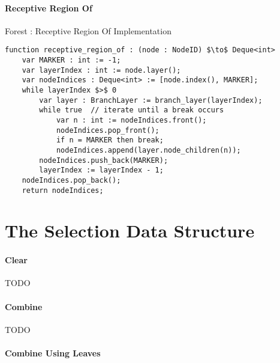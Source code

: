 \paragraph{Receptive Region Of}

\begin{stulisting}[H]
\caption{Forest : Receptive Region Of Implementation}
\begin{lstlisting}[style=Default]
function receptive_region_of : (node : NodeID) $\to$ Deque<int>
	var MARKER : int := -1;
	var layerIndex : int := node.layer();
	var nodeIndices : Deque<int> := [node.index(), MARKER];
	while layerIndex $>$ 0
		var layer : BranchLayer := branch_layer(layerIndex);
		while true	// iterate until a break occurs
			var n : int := nodeIndices.front();
			nodeIndices.pop_front();
			if n = MARKER then break;
			nodeIndices.append(layer.node_children(n));
		nodeIndices.push_back(MARKER);
		layerIndex := layerIndex - 1;
	nodeIndices.pop_back();
	return nodeIndices;
\end{lstlisting}
\end{stulisting}

\section{The Selection Data Structure}

\paragraph{Clear}

TODO

\paragraph{Combine}

TODO

\paragraph{Combine Using Leaves}

